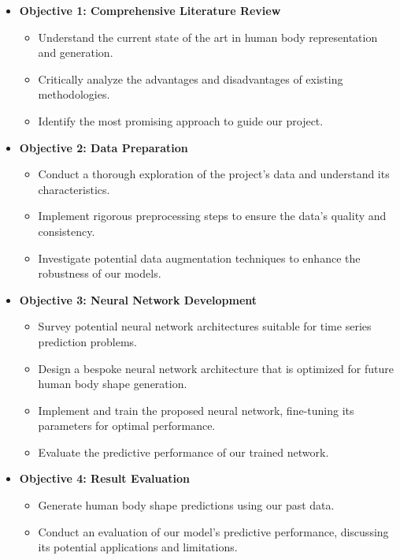 \begin{itemize}
	\item \textbf{Objective 1: Comprehensive Literature Review}
	      \begin{itemize}
		      \item Understand the current state of the art in human body representation and
		            generation.
		      \item Critically analyze the advantages and disadvantages of existing methodologies.
		      \item Identify the most promising approach to guide our project.
	      \end{itemize}

	\item \textbf{Objective 2: Data Preparation}
	      \begin{itemize}
		      \item Conduct a thorough exploration of the project's data and understand its
		            characteristics.
		      \item Implement rigorous preprocessing steps to ensure the data's quality and
		            consistency.
		      \item Investigate potential data augmentation techniques to enhance the robustness of
		            our models.
	      \end{itemize}

	\item \textbf{Objective 3: Neural Network Development}
	      \begin{itemize}
		      \item Survey potential neural network architectures suitable for time series
		            prediction problems.
		      \item Design a bespoke neural network architecture that is optimized for future human
		            body shape generation.
		      \item Implement and train the proposed neural network, fine-tuning its parameters for
		            optimal performance.
		      \item Evaluate the predictive performance of our trained network.
	      \end{itemize}

	\item \textbf{Objective 4: Result Evaluation}
	      \begin{itemize}
		      \item Generate human body shape predictions using our past data.
		      \item Conduct an evaluation of our model's predictive performance, discussing its
		            potential applications and limitations.
	      \end{itemize}

\end{itemize}
